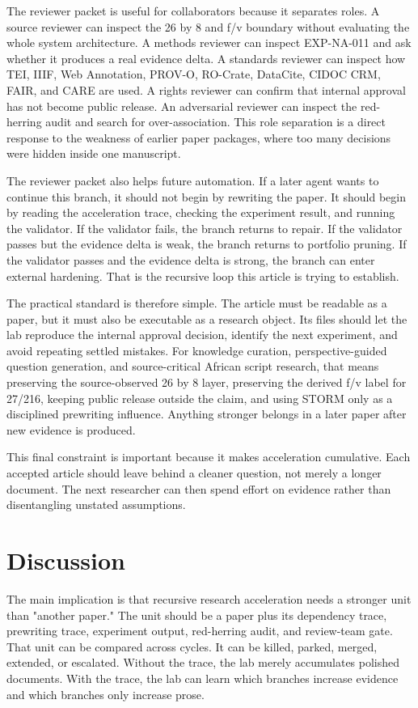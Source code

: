 \documentclass[sigconf,nonacm]{acmart}
\begin{document}
The reviewer packet is useful for collaborators because it separates roles. A
source reviewer can inspect the 26 by 8 and f/v boundary without evaluating the
whole system architecture. A methods reviewer can inspect EXP-NA-011 and ask
whether it produces a real evidence delta. A standards reviewer can inspect how
TEI, IIIF, Web Annotation, PROV-O, RO-Crate, DataCite, CIDOC CRM, FAIR, and CARE
are used. A rights reviewer can confirm that internal approval has not become
public release. An adversarial reviewer can inspect the red-herring audit and
search for over-association. This role separation is a direct response to the
weakness of earlier paper packages, where too many decisions were hidden inside
one manuscript.

The reviewer packet also helps future automation. If a later agent wants to
continue this branch, it should not begin by rewriting the paper. It should
begin by reading the acceleration trace, checking the experiment result, and
running the validator. If the validator fails, the branch returns to repair. If
the validator passes but the evidence delta is weak, the branch returns to
portfolio pruning. If the validator passes and the evidence delta is strong, the
branch can enter external hardening. That is the recursive loop this article is
trying to establish.

The practical standard is therefore simple. The article must be readable as a
paper, but it must also be executable as a research object. Its files should let
the lab reproduce the internal approval decision, identify the next experiment,
and avoid repeating settled mistakes. For knowledge curation, perspective-guided question generation, and source-critical African script research, that means preserving the
source-observed 26 by 8 layer, preserving the derived f/v label for 27/216,
keeping public release outside the claim, and using STORM only as a disciplined
prewriting influence. Anything stronger belongs in a later paper after new
evidence is produced.

This final constraint is important because it makes acceleration cumulative.
Each accepted article should leave behind a cleaner question, not merely a
longer document. The next researcher can then spend effort on evidence rather
than disentangling unstated assumptions.


\section{Discussion}
The main implication is that recursive research acceleration needs a stronger
unit than "another paper." The unit should be a paper plus its dependency trace,
prewriting trace, experiment output, red-herring audit, and review-team gate.
That unit can be compared across cycles. It can be killed, parked, merged,
extended, or escalated. Without the trace, the lab merely accumulates polished
documents. With the trace, the lab can learn which branches increase evidence
and which branches only increase prose.
\end{document}
